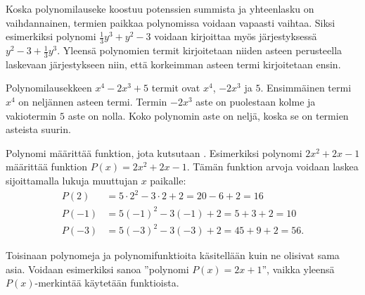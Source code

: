 Koska polynomilauseke koostuu potenssien summista ja yhteenlasku on vaihdannainen, termien paikkaa polynomissa voidaan vapaasti vaihtaa. Siksi esimerkiksi polynomi $\frac{1}{3}y^3+y^2-3$ voidaan kirjoittaa myös järjestyksessä $y^2-3+\frac{1}{3}y^3$. Yleensä polynomien termit kirjoitetaan niiden asteen perusteella laskevaan järjestykseen niin, että korkeimman asteen termi kirjoitetaan ensin.

\begin{esimerkki}
Polynomilausekkeen $x^4-2x^3+5$ termit ovat $x^4$, $-2x^3$ ja $5$.
Ensimmäinen termi $x^4$ on neljännen asteen termi. Termin $-2x^3$ aste on puolestaan kolme ja vakiotermin $5$ aste on nolla.
Koko polynomin aste on neljä, koska se on termien asteista suurin.
\end{esimerkki}



Polynomi määrittää funktion, jota kutsutaan . Esimerkiksi polynomi $2x^2+2x-1$ määrittää funktion $P(x)=2x^2+2x-1$. Tämän funktion arvoja voidaan laskea sijoittamalla lukuja muuttujan $x$ paikalle:
\begin{align*}
P(2) & = 5\cdot 2^2-3\cdot 2+2 = 20 - 6 + 2 = 16 \\
P(-1) & = 5(-1)^2-3(-1)+2 = 5 + 3 + 2 = 10 \\
P(-3) & = 5(-3)^2-3(-3)+2 = 45 + 9 + 2 = 56.
\end{align*}

Toisinaan polynomeja ja polynomifunktioita käsitellään kuin ne olisivat sama asia.
Voidaan esimerkiksi sanoa ''polynomi $P(x)=2x+1$'', vaikka yleensä $P(x)$-merkintää käytetään funktioista.


